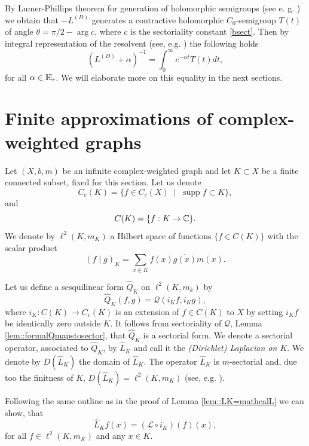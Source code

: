 \documentclass[a4paper,11pt]{amsart}
\theoremstyle{definition}
\DeclareMathOperator\supp{supp}
\newcommand{\Q}{\mathcal{Q}}
\begin{document}
By Lumer-Phillips theorem for generation of holomorphic semigroups (see e. g. \cite[p. 492, Theorem 1.24]{Kato}) we obtain that $-L^{(D)}$ generates a contractive holomorphic $C_0$-semigroup $T(t)$ of angle $\theta=\pi/2-\arg c$, where $c$ is the sectoriality constant \eqref{bsect}. Then by integral representation of the resolvent (see, e.g. \cite[p. 55 Theorem 1.10]{EngelNagel}) the following holds
\begin{equation*}\label{eq::resolvent}
(L^{(D)}+\alpha)^{-1}=\int_0^\infty e^{-\alpha t}T(t)dt,
\end{equation*}
for all $\alpha\in \Bbb H_r$. We will elaborate more on this equality in the next sections.

\section{Finite approximations of complex-weighted graphs}
\label{sect::finiteapprox}
Let $(X,b,m)$ be an infinite complex-weighted graph and let $K\subset X$ be a finite connected subset, fixed for this section. Let us denote 
$$
C_c(K)=\{f\in C_c(X)\;\mid\; \supp f\subset K\},
$$
and 
$$
C(K)=\{f: K\to \Bbb C\}.
$$
We denote by $\ell^2(K,m_K)$ a Hilbert space
of functions $\{f\in C(K)\}$ with the scalar product 
$$
(f\mid g)_K=\sum_{x\in K}f(x)\overline{g(x)}m(x).
$$



Let us define a sesquilinear form $\widehat Q_K$ on $\ell^2(K,m_k)$ by
$$
\widehat Q_K(f,g)=\mathcal Q(i_Kf,i_Kg),
$$
where   $i_K:C(K)\to C_c(K)$ is an extension of $f\in C(K)$ to $X$ by setting $i_Kf$ be identically zero outside $K$. It follows from sectoriality of $\Q$, Lemma \ref{lem::formalQmapstosector}, that $\widehat Q_K$ is a sectorial form. We denote a sectorial operator, associated to $\widehat  Q_K$, by $\widehat L_K$  and call it the  {\em (Dirichlet) Laplacian on $K$}. We denote by $D(\widehat L_K)$ the domain of $\widehat L_K$. The operator $\widehat L_K$ is $m$-sectorial and, due too the finitness of $K$,  $D(\widehat L_K)=\ell^2(K,m_K)$  (see, e.g. \cite[p. 322, Theorem 2.1]{Kato}). 

Following the same outline as in the proof of Lemma \ref{lem::LK=mathcalL} we can show, that 
$$
\widehat L_Kf(x)=(\mathcal L\circ i_K)(f)(x),
$$  
for all $f\in \ell^2(K,m_K)$ and any $x\in K$.
\end{document}
